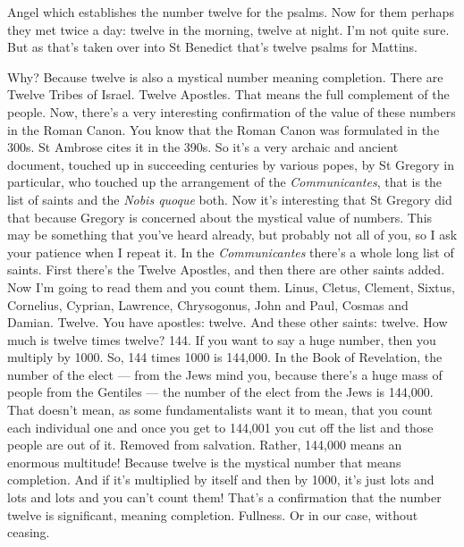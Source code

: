 Angel which establishes the number twelve for the psalms. Now for them perhaps they met twice a day: twelve in the morning, twelve at night. I'm not quite sure. But as that's taken over into St Benedict that's twelve psalms for Mattins.

Why? Because twelve is also a mystical number meaning completion. There are Twelve Tribes of Israel. Twelve Apostles. That means the full complement of the people. Now, there's a very interesting confirmation of the value of these numbers in the Roman Canon. You know that the Roman Canon was formulated in the 300s. St Ambrose cites it in the 390s. So it's a very archaic and ancient document, touched up in succeeding centuries by various popes, by St Gregory in particular, who touched up the arrangement of the \emph{Communicantes}, that is the list of saints and the \emph{Nobis quoque} both. Now it's interesting that St Gregory did that because Gregory is concerned about the mystical value of numbers. This may be something that you've heard already, but probably not all of you, so I ask your patience when I repeat it. In the \emph{Communicantes} there's a whole long list of saints. First there's the Twelve Apostles, and then there are other saints added. Now I'm going to read them and you count them. Linus, Cletus, Clement, Sixtus, Cornelius, Cyprian, Lawrence, Chrysogonus, John and Paul, Cosmas and Damian. Twelve. You have apostles: twelve. And these other saints: twelve. How much is twelve times twelve? 144. If you want to say a huge number, then you multiply by 1000. So, 144 times 1000 is 144,000. In the Book of Revelation, the number of the elect --- from the Jews mind you, because there's a huge mass of people from the Gentiles --- the number of the elect from the Jews is 144,000. That doesn't mean, as some fundamentalists want it to mean, that you count each individual one and once you get to 144,001 you cut off the list and those people are out of it. Removed from salvation. Rather, 144,000 means an enormous multitude! Because twelve is the mystical number that means completion. And if it's multiplied by itself and then by 1000, it's just lots and lots and lots and you can't count them! That's a confirmation that the number twelve is significant, meaning completion. Fullness. Or in our case, without ceasing.


